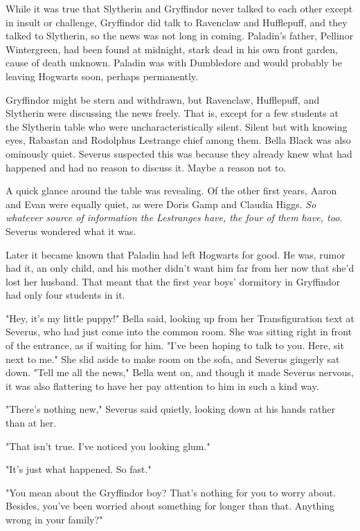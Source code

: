 While it was true that Slytherin and Gryffindor never talked to each other except in insult or challenge, Gryffindor did talk to Ravenclaw and Hufflepuff, and they talked to Slytherin, so the news was not long in coming. Paladin's father, Pellinor Wintergreen, had been found at midnight, stark dead in his own front garden, cause of death unknown. Paladin was with Dumbledore and would probably be leaving Hogwarts soon, perhaps permanently.

Gryffindor might be stern and withdrawn, but Ravenclaw, Hufflepuff, and Slytherin were discussing the news freely. That is, except for a few students at the Slytherin table who were uncharacteristically silent. Silent but with knowing eyes, Rabastan and Rodolphus Lestrange chief among them. Bella Black was also ominously quiet. Severus suspected this was because they already knew what had happened and had no reason to discuss it. Maybe a reason not to.

A quick glance around the table was revealing. Of the other first years, Aaron and Evan were equally quiet, as were Doris Gamp and Claudia Higgs. \emph{So whatever source of information the Lestranges have, the four of them have, too.} Severus wondered what it was.

Later it became known that Paladin had left Hogwarts for good. He was, rumor had it, an only child, and his mother didn't want him far from her now that she'd lost her husband. That meant that the first year boys' dormitory in Gryffindor had only four students in it.

"Hey, it's my little puppy!" Bella said, looking up from her Transfiguration text at Severus, who had just come into the common room. She was sitting right in front of the entrance, as if waiting for him. "I've been hoping to talk to you. Here, sit next to me." She slid aside to make room on the sofa, and Severus gingerly sat down. "Tell me all the news," Bella went on, and though it made Severus nervous, it was also flattering to have her pay attention to him in such a kind way.

"There's{\el} nothing new," Severus said quietly, looking down at his hands rather than at her.

"That isn't true. I've noticed you looking glum."

"It's just{\el} what happened. So{\el} fast."

"You mean about the Gryffindor boy? That's nothing for you to worry about. Besides, you've been worried about something for longer than that. Anything wrong in your family?"

